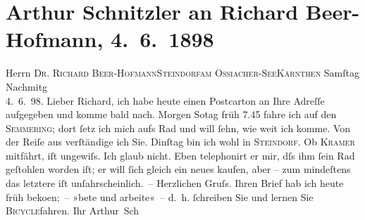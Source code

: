 

         
         \renewcommand{\erwaehntePersonen}{Personen: Richard Beer-Hofmann, Leopold Kramer}
         \renewcommand{\erwaehnteOrte}{Orte: I., Innere Stadt, Kärnten, Ossiacher See, Semmering, Steindorf am Ossiacher See, Wien}
         \renewcommand{\erwaehnteWerke}{}
               \section[Arthur Schnitzler an Richard Beer-Hofmann, 4. 6. 1898]{ Arthur Schnitzler an Richard Beer-Hofmann, 4. 6. 1898}\nopagebreak{}\rehead{ }\begin{ledgroupsized}[t]{13cm}\normalsize\beginnumbering{} \toendnotes[C]{\smallbreak\pagebreak[2]} 
\pstart{}{\pb}Herrn \textsc{Dr. Richard
                     Beer-Hofmann}\pend{}\pstart{}\textsc{Steindorf}\pend{}\pstart{}\textsc{am Ossiacher-See}\pend{}\pstart{}\textsc{Kärnthen}\pend{}{\bigskip}\pstart
           \raggedleft{}{\pb}Samſtag{ }Nachmitg{\\}4. 6. 98.\pend
           \pstart
           Lieber Richard, ich habe heute einen Postcarton an Ihre Adreſſe
               aufgegeben und komme bald nach. Morgen So{\geminationn}tag{ }früh 7.45 fahre ich auf den \textsc{Semmering}; dort ſetz ich mich aufs Rad und will ſehn, wie weit ich komme. Von der {\pb}Reiſe aus verſtändige ich Sie. Dinſtag
               bin ich wohl in \textsc{Steindorf}. Ob \textsc{Kramer} mitfährt, iſt ungewiſs. Ich glaub nicht. Eben telephonirt er mir, dſs ihm ſein
               Rad geſtohlen worden iſt; er will ſich gleich ein neues kaufen, aber – zum mindeſtens
               das letztere {\pb}iſt unſahrscheinlich. –\pend
           \pstart
           Herzlichen Gruſs. Ihren Brief hab ich heute früh beko{\geminationm}en; – »bete und arbeite« – d. h. ſchreiben Sie und lernen Sie \textsc{Bicycle}fahren.\pend
           \pstart Ihr \spacefill\mbox{Arthur Sch}\pend{}
         

\end{ledgroupsized}
